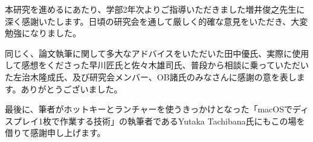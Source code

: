 \begin{acknowledgment}
  本研究を進めるにあたり、学部2年次よりご指導いただきました増井俊之先生に深く感謝いたします。日頃の研究会を通して厳しく的確な意見をいただき、大変勉強になりました。
  
  同じく、論文執筆に関して多大なアドバイスをいただいた田中優氏、実際に使用して感想をくださった早川匠氏と佐々木雄司氏、普段から相談に乗っていただいた左治木隆成氏、及び研究会メンバー、OB諸氏のみなさんに感謝の意を表します。ありがとうございました。
  
  最後に、筆者がホットキーとランチャーを使うきっかけとなった「macOSでディスプレイ1枚で作業する技術」の執筆者であるYutaka Tachibana氏にもこの場を借りて感謝申し上げます。
\end{acknowledgment}
